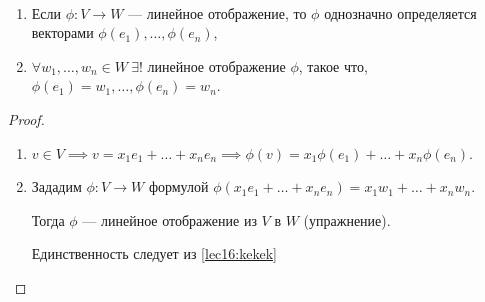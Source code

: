 \begin{proposal}~
    \label{lec16:propopop}
    \begin{enumerate}
    \item Если $\phi \colon V \to W$ --- линейное отображение, то $\phi$ однозначно определяется векторами $\phi(e_1), \dots, \phi(e_n)$,
    \item $\forall w_1, \dots, w_n \in W \ \exists!$ линейное отображение $\phi$, такое что, $\phi(e_1) = w_1, \dots, \phi(e_n) = w_n$.
    \end{enumerate}
\end{proposal}

\begin{proof}~
    \begin{enumerate}
    \item \label{lec16:kekek}
        $v \in V \implies v = x_1 e_1 + \dots + x_n e_n \implies \phi(v) = x_1 \phi(e_1) + \dots + x_n \phi(e_n)$.
    \item 
        Зададим $\phi \colon V \to W$ формулой $\phi(x_1 e_1 + \dots + x_n e_n) = x_1 w_1 + \dots + x_n w_n$.

        Тогда $\phi$ --- линейное отображение из $V$ в $W$ (упражнение).

        Единственность следует из \ref{lec16:kekek}
        \qedhere
    \end{enumerate}
\end{proof}
